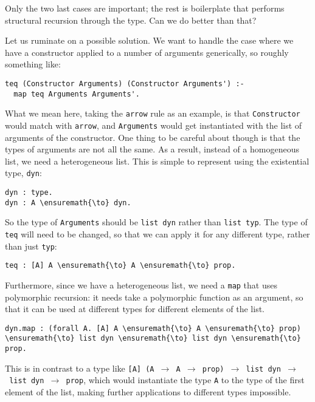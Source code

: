 Only the two last cases are important; the rest is boilerplate that
performs structural recursion through the type. Can we do better than
that?

Let us ruminate on a possible solution. We want to handle the case where
we have a constructor applied to a number of arguments generically, so
roughly something like:

\begin{verbatim}
teq (Constructor Arguments) (Constructor Arguments') :-
  map teq Arguments Arguments'.
\end{verbatim}

What we mean here, taking the \texttt{arrow} rule as an example, is that
\texttt{Constructor} would match with \texttt{arrow}, and
\texttt{Arguments} would get instantiated with the list of arguments of
the constructor. One thing to be careful about though is that the types
of arguments are not all the same. As a result, instead of a homogeneous
list, we need a heterogeneous list. This is simple to represent using
the existential type, \texttt{dyn}:

\begin{verbatim}
dyn : type.
dyn : A \ensuremath{\to} dyn.
\end{verbatim}

So the type of \texttt{Arguments} should be \texttt{list\ dyn} rather
than \texttt{list\ typ}. The type of \texttt{teq} will need to be
changed, so that we can apply it for any different type, rather than
just \texttt{typ}:

\begin{verbatim}
teq : [A] A \ensuremath{\to} A \ensuremath{\to} prop.
\end{verbatim}

Furthermore, since we have a heterogeneous list, we need a \texttt{map}
that uses polymorphic recursion: it needs take a polymorphic function as
an argument, so that it can be used at different types for different
elements of the list.

\begin{verbatim}
dyn.map : (forall A. [A] A \ensuremath{\to} A \ensuremath{\to} prop) \ensuremath{\to} list dyn \ensuremath{\to} list dyn \ensuremath{\to} prop.
\end{verbatim}

This is in contrast to a type like
\texttt{{[}A{]}\ (A\ \ensuremath{\to}\ A\ \ensuremath{\to}\ prop)\ \ensuremath{\to}\ list\ dyn\ \ensuremath{\to}\ list\ dyn\ \ensuremath{\to}\ prop},
which would instantiate the type \texttt{A} to the type of the first
element of the list, making further applications to different types
impossible.

